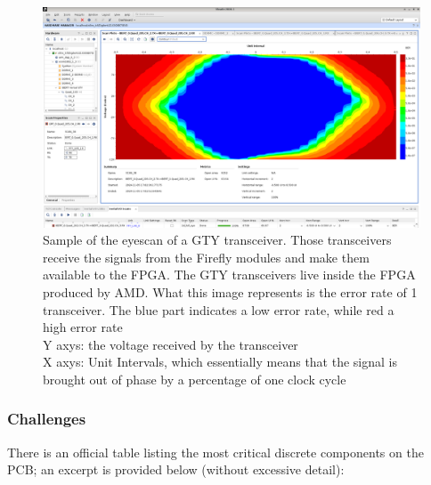\begin{figure}[H]
\centering
\includegraphics[width=\textwidth]{images/contributions/eyescan.png}
\caption[Sample of the eyescan of a GTY transceiver]{Sample of the eyescan of a GTY transceiver. Those transceivers receive the signals from the Firefly \protect\cite{firefly-optical-transceiver} modules and make them available to the FPGA. The GTY transceivers live inside the FPGA produced by AMD. What this image represents is the error rate of 1 transceiver. The blue part indicates a low error rate, while red a high error rate\\
Y axys: the voltage received by the transceiver\\
X axys: Unit Intervals, which essentially means that the signal is brought out of phase by a percentage of one clock cycle}
\label{fig:eyescan-test}
\end{figure}


\subsubsection{Challenges}

There is an official table listing the most critical discrete components on the \ac{PCB}; an excerpt is provided below (without excessive detail):

